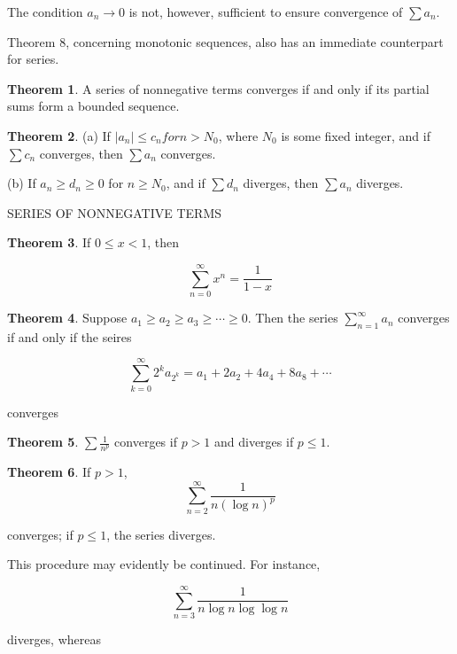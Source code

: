 \documentclass{article}
\theoremstyle{definition}
\newtheorem{theo}{Theorem}
\theoremstyle{remark}
\begin{document}
The condition $a_n\rightarrow 0$ is not, however, sufficient to ensure convergence of $\sum a_n$.

Theorem 8, concerning monotonic sequences, also has an immediate counterpart for series.

\begin{theo}
	A series of nonnegative terms converges if and only if its partial sums form a bounded sequence.
\end{theo}

\begin{theo}
\hspace{\fill}

	(a) If $|a_n|\le c_n for n>N_0$, where $N_0$ is some fixed integer, and if $\sum c_n$ converges, then $\sum a_n$ converges.
	
	(b) If $a_n\ge d_n\ge 0$ for $n\ge N_0$, and if $\sum d_n$ diverges, then $\sum a_n$ diverges.
\end{theo}

\newpage

SERIES OF NONNEGATIVE TERMS

\begin{theo}
	If $0\le x<1$, then
	
	\[
	\sum^\infty_{n=0}x^n=\frac{1}{1-x}
	\]
	
	
\end{theo}


\begin{theo}
	Suppose $a_1\ge a_2\ge a_3\ge \cdots\ge0$. Then the series $\sum^\infty_{n=1}a_n$ converges if and only if the seires
	
	\[
	\sum^\infty_{k=0}2^ka_{2^k}=a_1+2a_2+4a_4+8a_8+\cdots
	\]
	
\noindent	converges
\end{theo}

\begin{theo}
	$\sum \frac{1}{n^p}$ converges if $p>1$ and diverges if $p\le 1$.
\end{theo}

\begin{theo}
	If $p>1$,
	\[
	\sum^\infty_{n=2}\frac{1}{n(\log{n})^p}
	\]
	
	converges; if $p\le 1$, the series diverges.
\end{theo}

This procedure may evidently be continued. For instance,

\[
\sum^\infty_{n=3}\frac{1}{n\log{n}\log{\log{n}}}
\]

diverges, whereas
\end{document}
